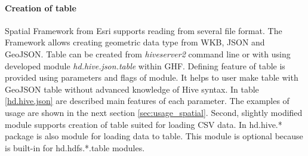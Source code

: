 \documentclass[a4paper,12pt,oneside]{report}
\begin{document}
	
    \paragraph{Creation of table} Spatial Framework from Esri supports reading  from
    several file format.  The Framework allows creating geometric data type from 
    WKB, JSON and GeoJSON. Table can be created from \textit{hiveserver2} command
    line or with using developed module  \textit{hd.hive.json.table} within GHF. 
    Defining feature of table is provided using parameters and flags of module. It helps
    to user make table with GeoJSON table without advanced knowledge of Hive
    syntax. In table \ref{hd.hive.json} are described main features of each parameter.
    The examples of usage are shown in the next section \ref{sec:usage_spatial}.
    Second, slightly modified module supports creation of table suited for loading
    CSV data. In hd.hive.* package is also module for loading data to table. This
    module is optional because is built-in for hd.hdfs.*.table modules. 

	
	
\end{document}

